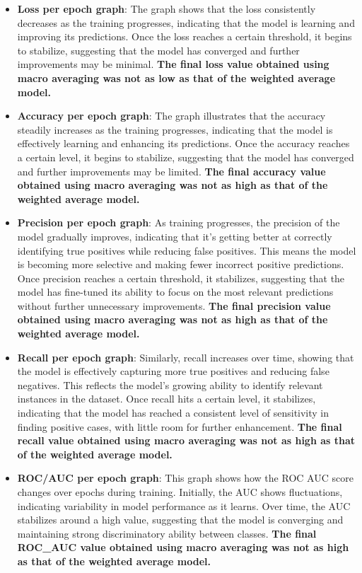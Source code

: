 \documentclass[a4paper,oneside,11pt]{book}
\begin{document}
\begin{itemize}
    \item \textbf{Loss per epoch graph}: The graph shows that the loss consistently decreases as the training progresses, indicating that the model is learning and improving its predictions. Once the loss reaches a certain threshold, it begins to stabilize, suggesting that the model has converged and further improvements may be minimal. \textbf{The final loss value obtained using macro averaging was not as low as that of the weighted average model.}
    \item \textbf{Accuracy per epoch graph}: The graph illustrates that the accuracy steadily increases as the training progresses, indicating that the model is effectively learning and enhancing its predictions. Once the accuracy reaches a certain level, it begins to stabilize, suggesting that the model has converged and further improvements may be limited. \textbf{The final accuracy value obtained using macro averaging was not as high as that of the weighted average model.}
    \item \textbf{Precision per epoch graph}: As training progresses, the precision of the model gradually improves, indicating that it's getting better at correctly identifying true positives while reducing false positives. This means the model is becoming more selective and making fewer incorrect positive predictions. Once precision reaches a certain threshold, it stabilizes, suggesting that the model has fine-tuned its ability to focus on the most relevant predictions without further unnecessary improvements. \textbf{The final precision value obtained using macro averaging was not as high as that of the weighted average model.}
    \item \textbf{Recall per epoch graph}: Similarly, recall increases over time, showing that the model is effectively capturing more true positives and reducing false negatives. This reflects the model's growing ability to identify relevant instances in the dataset. Once recall hits a certain level, it stabilizes, indicating that the model has reached a consistent level of sensitivity in finding positive cases, with little room for further enhancement. \textbf{The final recall value obtained using macro averaging was not as high as that of the weighted average model.}
    \item \textbf{ROC/AUC per epoch graph}: This graph shows how the ROC AUC score changes over epochs during training. Initially, the AUC shows fluctuations, indicating variability in model performance as it learns. Over time, the AUC stabilizes around a high value, suggesting that the model is converging and maintaining strong discriminatory ability between classes. \textbf{The final ROC\_AUC value obtained using macro averaging was not as high as that of the weighted average model.}

\end{itemize}
\end{document}
